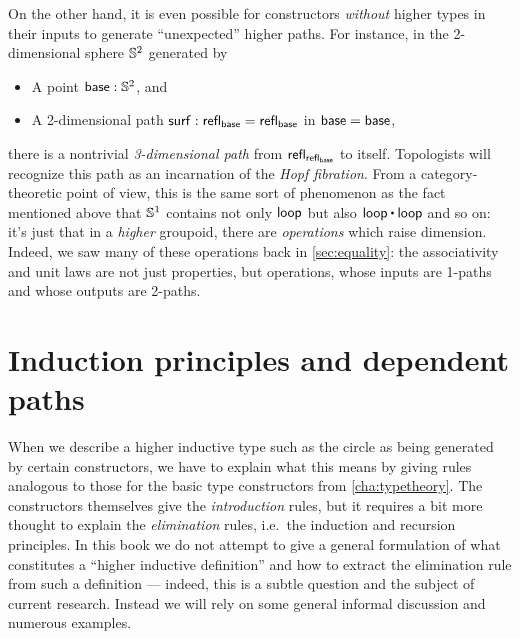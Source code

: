 On the other hand, it is even possible for constructors \emph{without} higher types in their inputs to generate ``unexpected'' higher paths.
For instance, in the 2-dimensional sphere $\mathbb{S}^2$ generated by
%
\begin{itemize}
\item A point $\mathsf{base}:\mathbb{S}^2$, and
\item A 2-dimensional path $\mathsf{surf}:\mathsf{refl}_{\mathsf{base}} = \mathsf{refl}_{\mathsf{base}}$ in ${\mathsf{base}=\mathsf{base}}$,
\end{itemize}
there is a nontrivial \emph{3-dimensional path} from $\mathsf{refl}_{\mathsf{refl}_{\mathsf{base}}}$ to itself.
Topologists will recognize this path as an incarnation of the \emph{Hopf fibration}.
From a category-theoretic point of view, this is the same sort of phenomenon as the fact mentioned above that $\mathbb{S}^1$ contains not only $\mathsf{loop}$ but also $\lloop\ct\lloop$ and so on: it's just that in a \emph{higher} groupoid, there are \emph{operations} which raise dimension.
Indeed, we saw many of these operations back in \autoref{sec:equality}: the associativity and unit laws are not just properties, but operations, whose inputs are 1-paths and whose outputs are 2-paths.

%

\vspace*{0pt plus 20ex}

\section{Induction principles and dependent paths}
\label{sec:dependent-paths}

When we describe a higher inductive type such as the circle as being generated by certain constructors, we have to explain what this means by giving rules analogous to those for the basic type constructors from \autoref{cha:typetheory}.
The constructors themselves give the \emph{introduction} rules, but it requires a bit more thought to explain the \emph{elimination} rules, i.e.\ the induction and recursion principles.
In this book we do not attempt to give a general formulation of what constitutes a ``higher inductive definition'' and how to extract the elimination rule from such a definition --- indeed, this is a subtle question and the subject of current research.
Instead we will rely on some general informal discussion and numerous examples.

